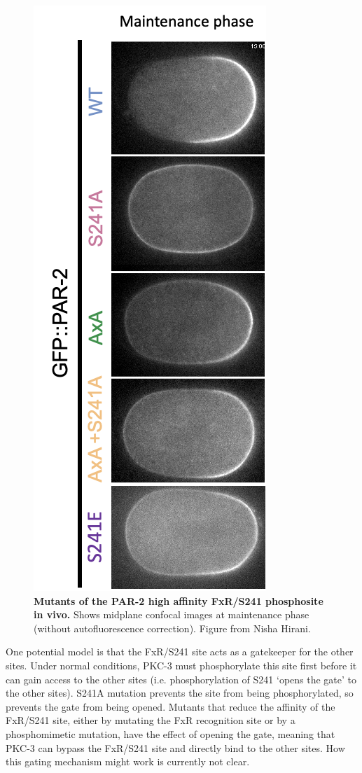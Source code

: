 \documentclass[12pt]{"report"}
\newcommand{\mycaption}[2]{\caption[#1]{\textbf{#1.} #2}}
\begin{document}
\begin{figure}
\includegraphics[scale=0.4]{par2_phos_mutants}
\centering
\mycaption{Mutants of the PAR-2 high affinity FxR/S241 phosphosite in vivo}{
Shows midplane confocal images at maintenance phase (without autofluorescence correction). Figure from Nisha Hirani.}
\label{fig:par2_phos_mutants}
\end{figure}

One potential model is that the FxR/S241 site acts as a gatekeeper for the other sites. Under normal conditions, PKC-3 must phosphorylate this site first before it can gain access to the other sites (i.e. phosphorylation of S241 `opens the gate' to the other sites). S241A mutation prevents the site from being phosphorylated, so prevents the gate from being opened. Mutants that reduce the affinity of the FxR/S241 site, either by mutating the FxR recognition site or by a phosphomimetic mutation, have the effect of opening the gate, meaning that PKC-3 can bypass the FxR/S241 site and directly bind to the other sites. How this gating mechanism might work is currently not clear. \\
\end{document}
